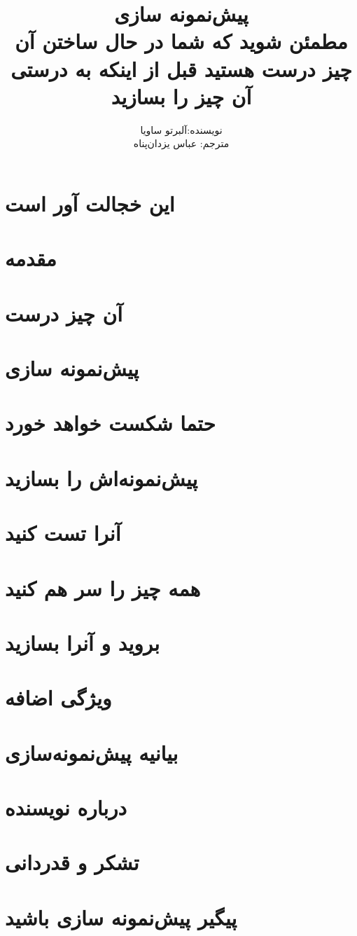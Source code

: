 \documentclass[a5paper,10pt]{book}
\author{نویسنده:آلبرتو ساویا
\\ مترجم: عباس یزدان‌پناه}
\title{پیش‌نمونه سازی
\\
مطمئن شوید که شما در حال ساختن  آن چیز درست هستید قبل از اینکه به درستی آن چیز را بسازید}
\begin{document}
\maketitle
\frontmatter
\tableofcontents

\chapter{این خجالت آور است}

\chapter{مقدمه}

\mainmatter
\chapter{آن چیز درست}

\chapter{پیش‌نمونه سازی}

\chapter{حتما شکست خواهد خورد}

\chapter{پیش‌نمونه‌اش را بسازید}

\chapter{‌آنرا تست کنید}

\chapter{همه چیز را سر هم کنید}

\chapter{بروید و آنرا بسازید}

\chapter{ویژگی اضافه}

\chapter{بیانیه پیش‌نمونه‌سازی}

\chapter{درباره نویسنده}

\chapter{تشکر و قدردانی}

\chapter{پیگیر پیش‌نمونه سازی باشید}

\end{document}
